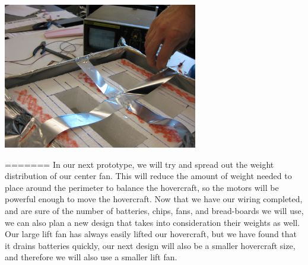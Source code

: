 \begin{center}
  \includegraphics[width=85mm]{imageSources/designProblemsnew_stick.png}
\end{center}
\label{new_stick}=======
In our next prototype, we will try and spread out the weight distribution of our center fan. This will reduce the amount of weight needed to place around the perimeter to balance the hovercraft, so the motors will be powerful enough to move the hovercraft. Now that we have our wiring completed, and are sure of the number of batteries, chips, fans, and bread-boards we will use, we can also plan a new design that takes into consideration their weights as well. Our large lift fan has always easily lifted our hovercraft, but we have found that it drains batteries quickly, our next design will also be a smaller hovercraft size, and therefore we will also use a smaller lift fan.

